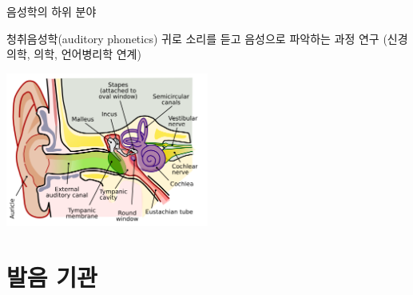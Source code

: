 \documentclass[11pt, aspectratio=169]{beamer}
\begin{document}
\begin{frame}[t]{음성학의 하위 분야}
    \begin{block}{청취음성학(auditory phonetics)}
        귀로 소리를 듣고 음성으로 파악하는 과정 연구 (신경의학, 의학, 언어병리학 연계)
    \end{block}
    \includegraphics[width=0.5\textwidth]{img/Anatomy_of_the_Human_Ear.png}
\end{frame}

\section{발음 기관}
\end{document}
